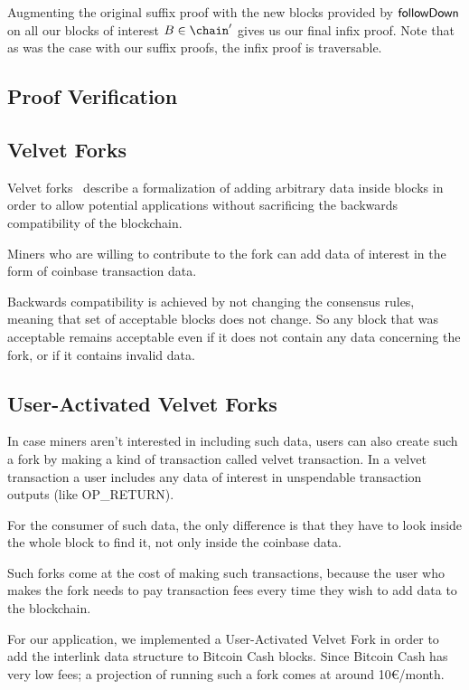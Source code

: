 Augmenting the original suffix proof with the new blocks provided by $\sf followDown$ on all our blocks of interest $B \in \chain'$ gives us our final infix proof. Note that as was the case with our suffix proofs, the infix proof is traversable.

\subsection{Proof Verification}
\subsection{Velvet Forks}

Velvet forks~\cite{nipopows,velvet} describe a formalization of adding arbitrary data inside blocks in order to allow potential applications without sacrificing the backwards compatibility of the blockchain.

Miners who are willing to contribute to the fork can add data of interest in the form of coinbase transaction data.

Backwards compatibility is achieved by not changing the consensus rules, meaning that set of acceptable blocks does not change. So any block that was acceptable remains acceptable even if it does not contain any data concerning the fork, or if it contains invalid data. 


\subsection{User-Activated Velvet Forks}
In case miners aren't interested in including such data, users can also create such a fork by making a kind of transaction called velvet transaction. In a velvet transaction a user includes any data of interest in unspendable transaction outputs (like OP\_RETURN).

For the consumer of such data, the only difference is that they have to look inside the whole block to find it, not only inside the coinbase data.

Such forks come at the cost of making such transactions, because the user who makes the fork needs to pay transaction fees every time they wish to add data to the blockchain.

For our application, we implemented a User-Activated Velvet Fork in order to add the interlink data structure to Bitcoin Cash blocks. Since Bitcoin Cash has very low fees; a projection of running such a fork comes at around 10€/month.
